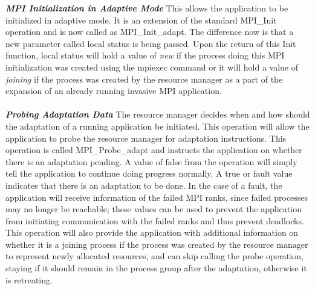 \textbf{\textit{MPI Initialization in Adaptive Mode}} This allows the application to be initialized in adaptive mode. It is an extension of the standard MPI{\_}Init operation and is now called as MPI{\_}Init{\_}adapt. The difference now is that a new parameter called local status is being passed. Upon the return of this Init function, local status will hold a value of \textit{new} if the process doing this MPI initialization was created using the mpiexec command or it will hold a value of \textit{joining} if the process was created by the resource manager as a part of the expansion of an already running invasive MPI application.\\ \\
\textbf{\textit{Probing Adaptation Data}} The resource manager decides when and how should the adaptation of a running application be initiated. This operation will allow the application to probe the resource manager for adaptation instructions. This operation is called MPI{\_}Probe{\_}adapt and instructs the application on whether there is an adaptation pending. A value of false from the operation will simply tell the application to continue doing progress normally. A true or fault value indicates that there is an adaptation to be done. In the case of a fault, the application will receive information of the failed MPI ranks, since failed processes may no longer be reachable; these values can be used to prevent the application from initiating communication with the failed  ranks and thus prevent deadlocks. This operation will also provide the application with additional information on whether it is a joining process if the process was created by the resource manager to represent newly allocated resources, and can skip calling the probe operation, staying if it should remain in the process group after the adaptation, otherwise it is retreating.\\ \\
